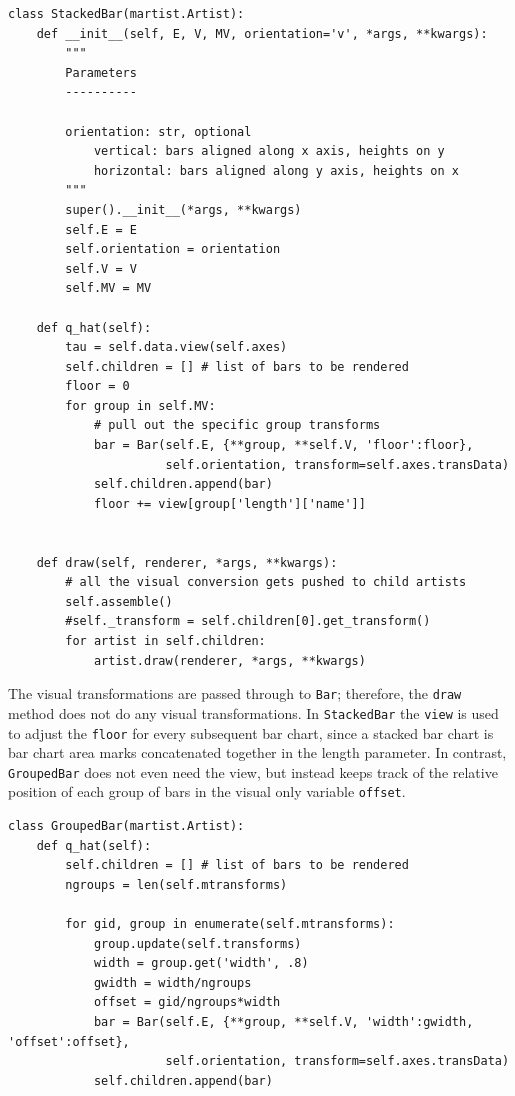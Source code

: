 \documentclass[../main.tex]{subfiles}
\begin{document}
\begin{verbatim}
class StackedBar(martist.Artist):
    def __init__(self, E, V, MV, orientation='v', *args, **kwargs):
        """
        Parameters
        ----------
   
        orientation: str, optional
            vertical: bars aligned along x axis, heights on y
            horizontal: bars aligned along y axis, heights on x   
        """
        super().__init__(*args, **kwargs)
        self.E = E
        self.orientation = orientation
        self.V = V
        self.MV = MV

    def q_hat(self):
        tau = self.data.view(self.axes)
        self.children = [] # list of bars to be rendered
        floor = 0
        for group in self.MV:
            # pull out the specific group transforms
            bar = Bar(self.E, {**group, **self.V, 'floor':floor}, 
                      self.orientation, transform=self.axes.transData)
            self.children.append(bar)
            floor += view[group['length']['name']]
            
            
    def draw(self, renderer, *args, **kwargs):
        # all the visual conversion gets pushed to child artists
        self.assemble()
        #self._transform = self.children[0].get_transform()
        for artist in self.children:
            artist.draw(renderer, *args, **kwargs)

\end{verbatim}

The visual transformations are passed through to \texttt{Bar}; therefore, the \texttt{draw} method does not do any visual transformations. In \texttt{StackedBar} the \texttt{view} is used to adjust the \texttt{floor} for every subsequent bar chart, since a stacked bar chart is bar chart area marks concatenated together in the length parameter. In contrast, \texttt{GroupedBar} does not even need the view, but instead keeps track of the relative position of each group of bars in the visual only variable \texttt{offset}. 

\begin{verbatim}
class GroupedBar(martist.Artist):
    def q_hat(self):
        self.children = [] # list of bars to be rendered
        ngroups = len(self.mtransforms)
        
        for gid, group in enumerate(self.mtransforms):
            group.update(self.transforms)
            width = group.get('width', .8)
            gwidth = width/ngroups
            offset = gid/ngroups*width 
            bar = Bar(self.E, {**group, **self.V, 'width':gwidth, 'offset':offset}, 
                      self.orientation, transform=self.axes.transData)     
            self.children.append(bar)
\end{verbatim}
\end{document}

